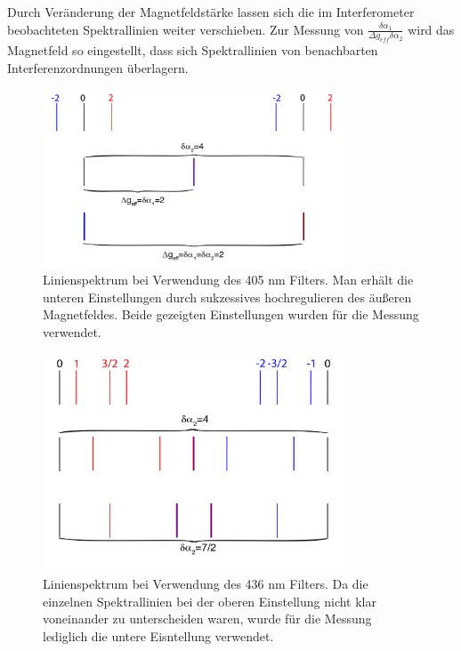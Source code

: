\documentclass[bigchapter,colorback,accentcolor=tud4b,linedtoc,11pt]{tudreport}
\begin{document}
Durch Veränderung der Magnetfeldstärke lassen sich die im Interferometer
beobachteten Spektrallinien weiter verschieben. Zur Messung von
$\frac{\delta\alpha_1}{\Delta g_{eff} \delta\alpha_2}$ wird das Magnetfeld so
eingestellt, dass sich Spektrallinien von benachbarten Interferenzordnungen
überlagern. 

\begin{figure}[H] 
  \centering
     \includegraphics[width=0.8\textwidth]{img/linienspektrum405.png}
  \caption{Linienspektrum bei Verwendung des 405 nm Filters. Man erhält die
    unteren Einstellungen durch sukzessives hochregulieren des äußeren Magnetfeldes. Beide gezeigten
    Einstellungen wurden für die Messung verwendet.}
  \label{fig:405nmlines}
\end{figure}

\begin{figure}[H] 
  \centering
     \includegraphics[width=0.8\textwidth]{img/linienspektrum436.png}
     \caption{Linienspektrum bei Verwendung des 436 nm Filters. Da die einzelnen
       Spektrallinien bei der oberen Einstellung nicht klar voneinander zu
       unterscheiden waren, wurde für die Messung lediglich die untere
       Eisntellung verwendet.}
  \label{fig:436nmlines}
\end{figure}
\end{document}

